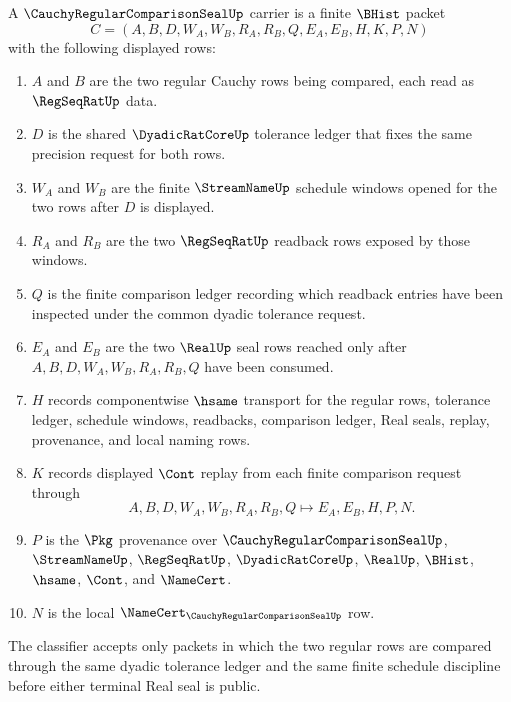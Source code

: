 \begin{definition}
\label{def:cauchy-regular-comparison-seal-carrier}
A $\CauchyRegularComparisonSealUp$ carrier is a finite $\BHist$ packet
$$
C=(A,B,D,W_A,W_B,R_A,R_B,Q,E_A,E_B,H,K,P,N)
$$
with the following displayed rows:
\begin{enumerate}
\item $A$ and $B$ are the two regular Cauchy rows being compared, each read as $\RegSeqRatUp$ data.
\item $D$ is the shared $\DyadicRatCoreUp$ tolerance ledger that fixes the same precision request for both rows.
\item $W_A$ and $W_B$ are the finite $\StreamNameUp$ schedule windows opened for the two rows after $D$ is displayed.
\item $R_A$ and $R_B$ are the two $\RegSeqRatUp$ readback rows exposed by those windows.
\item $Q$ is the finite comparison ledger recording which readback entries have been inspected under the common dyadic tolerance request.
\item $E_A$ and $E_B$ are the two $\RealUp$ seal rows reached only after $A,B,D,W_A,W_B,R_A,R_B,Q$ have been consumed.
\item $H$ records componentwise $\hsame$ transport for the regular rows, tolerance ledger, schedule windows, readbacks, comparison ledger, Real seals, replay, provenance, and local naming rows.
\item $K$ records displayed $\Cont$ replay from each finite comparison request through
$$
A,B,D,W_A,W_B,R_A,R_B,Q \longmapsto E_A,E_B,H,P,N .
$$
\item $P$ is the $\Pkg$ provenance over $\CauchyRegularComparisonSealUp$, $\StreamNameUp$, $\RegSeqRatUp$, $\DyadicRatCoreUp$, $\RealUp$, $\BHist$, $\hsame$, $\Cont$, and $\NameCert$.
\item $N$ is the local $\NameCert_{\CauchyRegularComparisonSealUp}$ row.
\end{enumerate}
The classifier accepts only packets in which the two regular rows are compared through the same dyadic tolerance ledger and the same finite schedule discipline before either terminal Real seal is public.
\end{definition}

